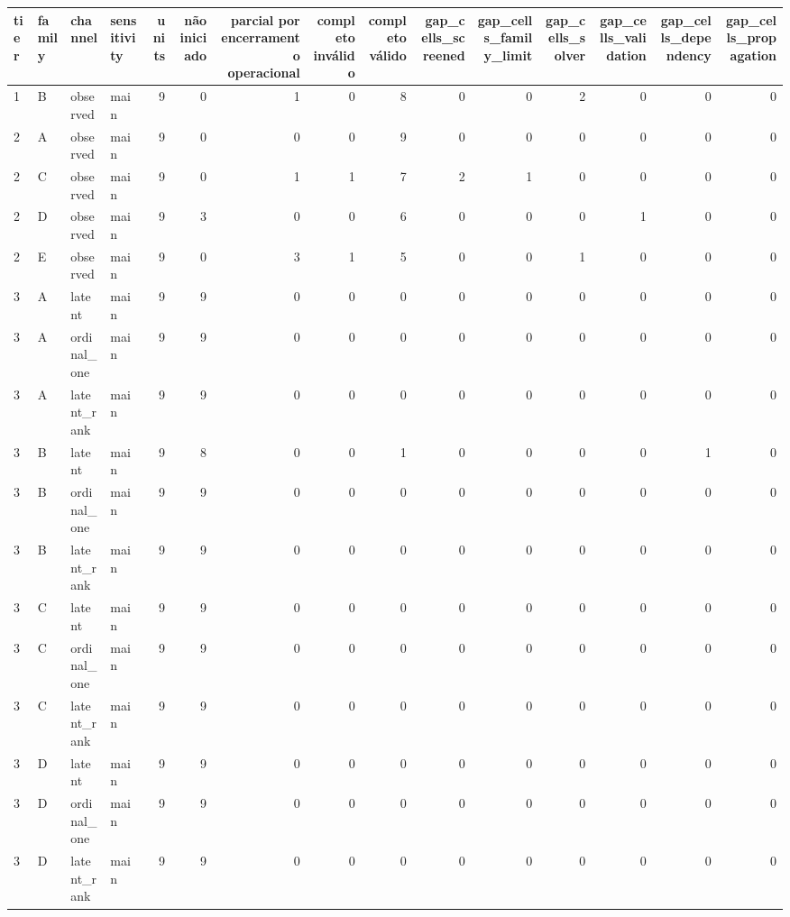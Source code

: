 \begin{tabular}{llllrrrrrrrrrrr}
\toprule
tier & family & channel & sensitivity & units & não iniciado & parcial por encerramento operacional & completo inválido & completo válido & gap\_cells\_screened & gap\_cells\_family\_limit & gap\_cells\_solver & gap\_cells\_validation & gap\_cells\_dependency & gap\_cells\_propagation \\
\midrule
1 & B & observed & main & 9 & 0 & 1 & 0 & 8 & 0 & 0 & 2 & 0 & 0 & 0 \\
2 & A & observed & main & 9 & 0 & 0 & 0 & 9 & 0 & 0 & 0 & 0 & 0 & 0 \\
2 & C & observed & main & 9 & 0 & 1 & 1 & 7 & 2 & 1 & 0 & 0 & 0 & 0 \\
2 & D & observed & main & 9 & 3 & 0 & 0 & 6 & 0 & 0 & 0 & 1 & 0 & 0 \\
2 & E & observed & main & 9 & 0 & 3 & 1 & 5 & 0 & 0 & 1 & 0 & 0 & 0 \\
3 & A & latent & main & 9 & 9 & 0 & 0 & 0 & 0 & 0 & 0 & 0 & 0 & 0 \\
3 & A & ordinal\_one & main & 9 & 9 & 0 & 0 & 0 & 0 & 0 & 0 & 0 & 0 & 0 \\
3 & A & latent\_rank & main & 9 & 9 & 0 & 0 & 0 & 0 & 0 & 0 & 0 & 0 & 0 \\
3 & B & latent & main & 9 & 8 & 0 & 0 & 1 & 0 & 0 & 0 & 0 & 1 & 0 \\
3 & B & ordinal\_one & main & 9 & 9 & 0 & 0 & 0 & 0 & 0 & 0 & 0 & 0 & 0 \\
3 & B & latent\_rank & main & 9 & 9 & 0 & 0 & 0 & 0 & 0 & 0 & 0 & 0 & 0 \\
3 & C & latent & main & 9 & 9 & 0 & 0 & 0 & 0 & 0 & 0 & 0 & 0 & 0 \\
3 & C & ordinal\_one & main & 9 & 9 & 0 & 0 & 0 & 0 & 0 & 0 & 0 & 0 & 0 \\
3 & C & latent\_rank & main & 9 & 9 & 0 & 0 & 0 & 0 & 0 & 0 & 0 & 0 & 0 \\
3 & D & latent & main & 9 & 9 & 0 & 0 & 0 & 0 & 0 & 0 & 0 & 0 & 0 \\
3 & D & ordinal\_one & main & 9 & 9 & 0 & 0 & 0 & 0 & 0 & 0 & 0 & 0 & 0 \\
3 & D & latent\_rank & main & 9 & 9 & 0 & 0 & 0 & 0 & 0 & 0 & 0 & 0 & 0 \\

\end{tabular}
